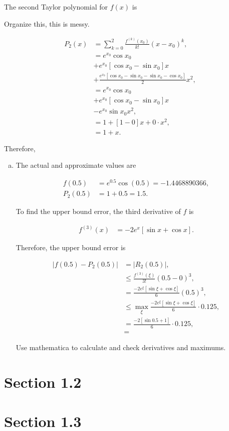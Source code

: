 \documentclass[a4paper, 10pt]{article}
\newenvironment{answer}[1][Answer]{\begin{trivlist}
\item[\hskip\labelsep{\textit{#1.}}]}{\end{trivlist}}
\begin{document}
\begin{answer}
	The second Taylor polynomial for $f(x)$ is

	{\color{blue} Organize this, this is messy.}

	\begin{align*}
		P_2(x) &= \sum_{k=0}^2 \frac{f^{(k)}(x_0)}{k!} (x - x_0)^k,\\
			   &= e^{x_0} \cos{x_0}\\
			   &+ e^{x_0} \left[ \cos{x_0} - \sin{x_0} \right] x\\
			   &+ \frac{e^{x_0} \left[\cos{x_0} - \sin{x_0} - \sin{x_0} - \cos{x_0} \right]}{2} x^2,\\
			   &= e^{x_0} \cos{x_0}\\
			   &+ e^{x_0} \left[ \cos{x_0} - \sin{x_0} \right] x\\
			   &- e^{x_0} \sin{x_0} x^2,\\
			   &= 1 + \left[ 1 - 0  \right] x + 0 \cdot x^2,\\
			   &= 1 + x.
	\end{align*}

	Therefore, 

	\begin{enumerate}[(a)]
		\item The actual and approximate values are 

			\begin{align*}
				f(0.5) &= e^{0.5} \cos{(0.5)} = - 1.4468890366,\\
				P_2(0.5) &= 1 + 0.5 = 1.5.
			\end{align*}

			To find the upper bound error, the third derivative of $f$ is

			\begin{align*}
				f^{(3)}(x) &= -2 e^{x} \left[ \sin{x} + \cos{x} \right]. 
			\end{align*}

			Therefore, the upper bound error is

			\begin{align*}
				| f(0.5) - P_2(0.5) | &= | R_2 (0.5) |,\\
				&\leq \frac{f^{(3)}(\xi)}{3!} (0.5 - 0)^{3},\\
				&= \frac{-2 e^\xi \left[ \sin\xi + \cos\xi \right]}{6} (0.5)^3,\\
				&\leq \max_\xi \frac{-2e^\xi \left[ \sin\xi + \cos\xi \right]}{6} \cdot 0.125,\\
				&= \frac{-2 \left[ \sin{0.5} + 1 \right]}{6} \cdot 0.125,\\ 
				&= 
			\end{align*}

			{\color{blue} Use mathematica to calculate and check derivatives and maximums.}
	\end{enumerate}
\end{answer}

\section{Section 1.2}


\section{Section 1.3}

\end{document}
